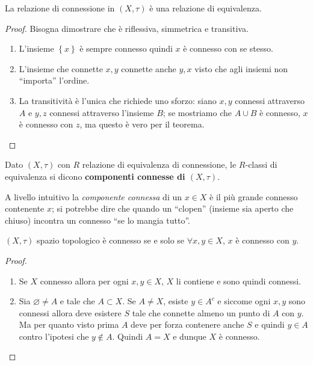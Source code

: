 \begin{corollary}
	La relazione di connessione in $(X, \tau)$ è una relazione di equivalenza. 
\end{corollary} 
\begin{proof}
	Bisogna dimostrare che è riflessiva, simmetrica e transitiva.
	\begin{enumerate}
		\item	L'insieme $\left\{x\right\}$ è sempre connesso quindi $x$ è connesso con se stesso.
		\item L'insieme che connette $x,y$ connette anche $y,x$ visto che agli insiemi non \enquote{importa} l'ordine.
		\item La transitività è l'unica che richiede uno sforzo: siano $x,y$ connessi attraverso $A$ e $y,z$ connessi attraverso l'insieme $B$; se mostriamo che $A \cup B$ è connesso, $x$ è connesso con $z$, ma questo è vero per il teorema. 
	\end{enumerate}
\end{proof}

\begin{definition}
	Dato $(X, \tau)$ con $R$ relazione di equivalenza di connessione, le $R$-classi di equivalenza si dicono \textbf{componenti connesse di $(X, \tau)$}.
\end{definition} 

\begin{remark}
	A livello intuitivo la \textit{componente connessa} di un $x\in X$ è il più grande connesso contenente $x$; si potrebbe dire che quando un \enquote{clopen} (insieme sia aperto che chiuso) incontra un connesso \enquote{se lo mangia tutto}.
\end{remark}

\begin{theorem}
	\label{thr:3.21.4}
	$(X, \tau)$ spazio topologico è connesso se e solo se $\forall x, y \in X$, $x$ è connesso con $y$.
\end{theorem} 
\begin{proof} \
	\begin{enumerate}
		\item Se $X$ connesso allora per ogni $x, y \in X$, $X$ li contiene e sono quindi connessi. 
		\item Sia $\varnothing \neq A$ e tale che $A \subset X$. Se $A \neq X$, esiste $y \in A^c$ e siccome ogni $x, y$ sono connessi allora deve esistere $S$ tale che connette almeno un punto di $A$ con $y$. Ma per quanto visto prima $A$ deve per forza contenere anche $S$ e quindi $y \in A$ contro l'ipotesi che $y \notin A$. Quindi $A = X$ e dunque $X$ è connesso. 
	\end{enumerate}
\end{proof}

